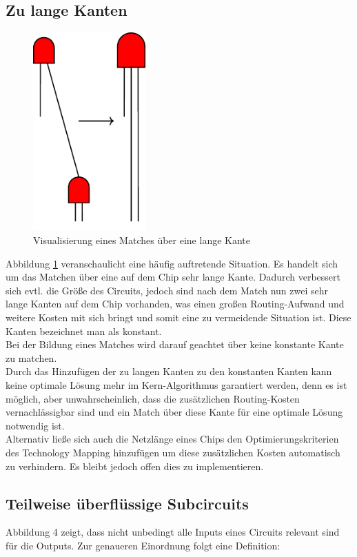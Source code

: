 \documentclass[11pt, a4paper, german]{article}
\newcommand{\TM}{Technology  Mapping }
\begin{document}
\subsection{Zu lange Kanten}
\label{subsec:zu_lange_kanten}
 \begin{figure}
		\includegraphics[height = 7.6cm]{pictures/compiled/zu_lange_kante}
		\caption{Visualisierung eines Matches über eine lange Kante}
		\label{bild:zu_lange_kanten}
\end{figure}
Abbildung \ref{bild:zu_lange_kanten} veranschaulicht eine häufig auftretende Situation. Es handelt sich um das Matchen über eine auf dem Chip sehr lange Kante. Dadurch verbessert sich evtl. die Größe des Circuits, jedoch sind nach dem Match nun zwei sehr lange Kanten auf dem Chip vorhanden, was einen großen Routing-Aufwand und weitere Kosten mit sich bringt und somit eine zu vermeidende Situation ist. 
Diese Kanten bezeichnet man als konstant.\\
Bei der Bildung eines Matches wird darauf geachtet über keine konstante Kante zu matchen.\\
Durch das Hinzufügen der zu langen Kanten zu den konstanten Kanten kann keine optimale Lösung mehr im Kern-Algorithmus garantiert werden, denn es ist möglich, aber unwahrscheinlich, dass die zusätzlichen Routing-Kosten vernachlässigbar sind und ein Match über diese Kante für eine optimale Lösung notwendig ist. \\
Alternativ lie{\ss}e sich auch die Netzl\"ange eines Chips den Optimierungskriterien des \TM hinzuf\"ugen um diese zus\"atzlichen Kosten automatisch zu verhindern. Es bleibt jedoch offen dies zu implementieren.

 \subsection{Teilweise überflüssige Subcircuits}
 \label{subsec:teilweise_ueberfkl_subcircuits}
 Abbildung 4 zeigt, dass nicht unbedingt alle Inputs eines Circuits relevant sind für die Outputs. Zur genaueren Einordnung folgt eine Definition:
 
\end{document}
